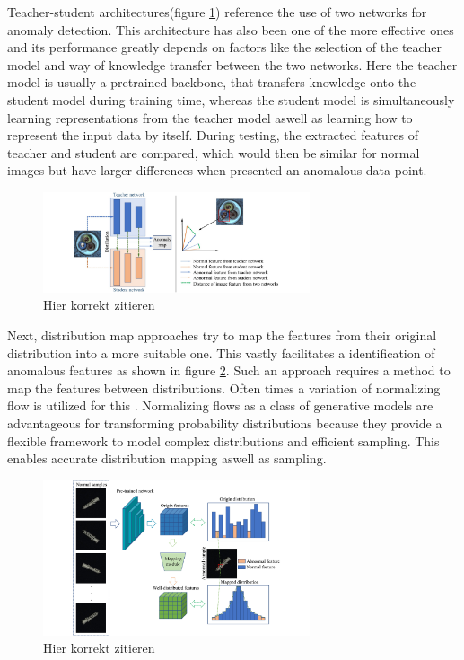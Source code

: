 Teacher-student architectures(figure \ref{fig:TSviz}) reference the use of two networks for anomaly detection. 
This architecture has also been one of the more effective ones and its performance greatly depends on factors like the selection of the teacher model and way 
of knowledge transfer between the two networks. Here the teacher model is usually a pretrained 
backbone, that transfers knowledge onto the student model during training time, whereas the student model is simultaneously learning representations from the teacher model aswell as learning 
how to represent the input data by itself. During testing, the extracted features of teacher and student are compared, which would then be similar for normal images but have larger differences 
when presented an anomalous data point.\newline


\begin{figure}[H]
    \centering
    \includegraphics[width=0.7\textwidth]{figures/approachvizgeneral/TSviz.jpg}
    \caption{Hier korrekt zitieren}
    \label{fig:TSviz}
\end{figure}



Next, distribution map approaches try to map the features from their original distribution into a more suitable one. This vastly facilitates a identification of anomalous features as shown in 
figure \ref{fig:distmapviz}. Such an approach requires a method to map the features between distributions. Often times a variation of normalizing flow is utilized for this \cite{liu2024deep}. 
Normalizing flows as a class of generative models \cite{Kobyzev_2021normalizingflowexplanation} are advantageous for transforming probability distributions because they provide a flexible 
framework to model complex distributions and efficient sampling. This enables accurate distribution mapping aswell as sampling. \newline


\begin{figure}[H]
    \centering
    \includegraphics[width=0.7\textwidth]{figures/approachvizgeneral/distmapviz.jpg}
    \caption{Hier korrekt zitieren}
    \label{fig:distmapviz}
\end{figure}


